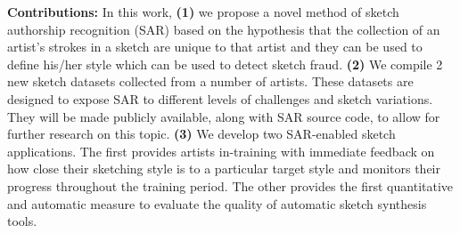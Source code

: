 \vspace{-1mm}
\textbf{Contributions:} In this work, \textbf{(1)} we propose a novel method of sketch authorship recognition (SAR) based on the hypothesis that the collection of an artist's strokes in a sketch are unique to that artist and they can be used to define his/her style which can be used to detect sketch fraud. \textbf{(2)} We compile 2 new sketch datasets collected from  a number of artists. These datasets are designed to expose SAR to different levels of challenges and sketch variations. They will be made publicly available, along with SAR source code, to allow for further research on this topic. \textbf{(3)} We develop two SAR-enabled sketch applications. The first provides artists in-training with immediate feedback on how close their sketching style is to a particular target style and monitors their progress throughout the training period. The other provides the first quantitative and automatic measure to evaluate the quality of automatic sketch synthesis tools.




